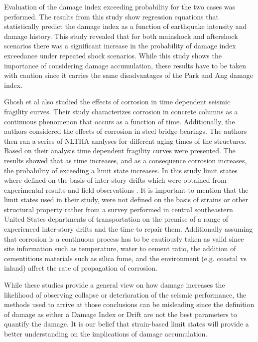 Evaluation of the damage index exceeding probability for the two cases was performed. The results from this study show regression equations that statistically predict the damage index as a function of earthquake intensity and damage history. This study revealed that for both mainshock and aftershock scenarios there was a significant increase in the probability of damage index exceedance under repeated shock scenarios. While this study shows the importance of considering damage accumulation, these results have to be taken with caution since it carries the same disadvantages of the Park and Ang damage index.

Ghosh et al \cite{Ghosh2010} also studied the effects of corrosion in time dependent seismic fragility curves. Their study characterizes corrosion in concrete columns as a continuous phenomenon that occurs as a function of time. Additionally, the authors considered the effects of corrosion in steel bridge bearings. The authors then ran a series of NLTHA analyses for different aging times of the structures. Based on their analysis time dependent fragility curves were presented. The results showed that as time increases, and as a consequence corrosion increases, the probability of exceeding a limit state increases. In this study limit states where defined on the basis of inter-story drifts which were obtained from experimental results and field observations \cite{Padgett2007}. It is important to mention that the limit states used in their study, were not defined on the basis of strains or other structural property rather from a survey performed in central southeastern United States departments of transportation on the premise of a range of experienced inter-story drifts and the time to repair them. Additionally assuming that corrosion is a continuous process has to be cautiously taken as valid since site information such as temperature, water to cement ratio, the addition of cementitious materials such as silica fume, and the environment (e.g. coastal vs inland) affect the rate of propagation of corrosion\cite{Thoft-Christensen}.

While these studies provide a general view on how damage increases the likelihood of observing collapse or deterioration of the seismic performance, the methods used to arrive at those conclusions can be misleading since the definition of damage as either a Damage Index or Drift are not the best parameters to quantify the damage. It is our belief that strain-based limit states will provide a better understanding on the implications of damage accumulation.
